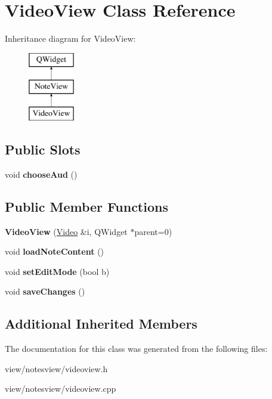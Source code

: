 \hypertarget{class_video_view}{\section{Video\-View Class Reference}
\label{class_video_view}
}
Inheritance diagram for Video\-View\-:\begin{figure}[H]
\begin{center}
\leavevmode
\includegraphics[height=3.000000cm]{class_video_view}
\end{center}
\end{figure}
\subsection*{Public Slots}
\begin{DoxyCompactItemize}
\item 
\hypertarget{class_video_view_a4b02a8c6e7a7349237c17bda4aba1371}{void {\bfseries choose\-Aud} ()}\label{class_video_view_a4b02a8c6e7a7349237c17bda4aba1371}

\end{DoxyCompactItemize}
\subsection*{Public Member Functions}
\begin{DoxyCompactItemize}
\item 
\hypertarget{class_video_view_a749811e5b7f14b5c2689de7d991e27d2}{{\bfseries Video\-View} (\hyperlink{class_video}{Video} \&i, Q\-Widget $\ast$parent=0)}\label{class_video_view_a749811e5b7f14b5c2689de7d991e27d2}

\item 
\hypertarget{class_video_view_aee4db3704a73252f624b2deb98b81151}{void {\bfseries load\-Note\-Content} ()}\label{class_video_view_aee4db3704a73252f624b2deb98b81151}

\item 
\hypertarget{class_video_view_a30cf8c284a2aece5065a0868edcd8d6d}{void {\bfseries set\-Edit\-Mode} (bool b)}\label{class_video_view_a30cf8c284a2aece5065a0868edcd8d6d}

\item 
\hypertarget{class_video_view_ae8a23beff53708f18c442332d37c663e}{void {\bfseries save\-Changes} ()}\label{class_video_view_ae8a23beff53708f18c442332d37c663e}

\end{DoxyCompactItemize}
\subsection*{Additional Inherited Members}


The documentation for this class was generated from the following files\-:\begin{DoxyCompactItemize}
\item 
view/notesview/videoview.\-h\item 
view/notesview/videoview.\-cpp\end{DoxyCompactItemize}
